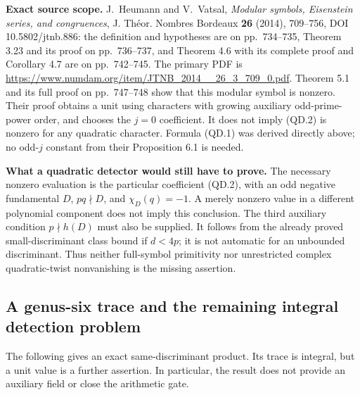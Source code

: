 \documentclass[11pt,a4paper]{article}
\theoremstyle{definition}
\renewcommand{\paragraph}[1]{\par\smallskip\noindent\textbf{#1}\quad\ignorespaces}
\begin{document}
\paragraph{Exact source scope.}
J.~Heumann and V.~Vatsal, \emph{Modular symbols, Eisenstein series,
and congruences}, J. Th\'eor. Nombres Bordeaux \textbf{26} (2014),
709--756, DOI 10.5802/jtnb.886: the definition and hypotheses are on
pp.~734--735, Theorem 3.23 and its proof on pp.~736--737, and
Theorem 4.6 with its complete proof and Corollary 4.7 are on
pp.~742--745.  The primary PDF is
\url{https://www.numdam.org/item/JTNB_2014__26_3_709_0.pdf}.
Theorem 5.1 and its full proof on pp.~747--748 show that this modular
symbol is nonzero.  Their proof obtains a unit using characters with
growing auxiliary odd-prime-power order, and chooses the $j=0$
coefficient.  It does not imply (QD.2) is nonzero for any quadratic
character.  Formula (QD.1) was derived directly above; no odd-$j$
constant from their Proposition 6.1 is needed.

\paragraph{What a quadratic detector would still have to prove.}
The necessary nonzero evaluation is the particular coefficient (QD.2),
with an odd negative fundamental $D$, $p q\nmid D$, and
$\chi_D(q)=-1$.  A merely nonzero value in a different polynomial
component does not imply this conclusion.  The third auxiliary
condition $p\nmid h(D)$ must also be supplied.  It follows from the
already proved small-discriminant class bound if $d<4p$; it is not
automatic for an unbounded discriminant.  Thus neither full-symbol
primitivity nor unrestricted complex quadratic-twist nonvanishing is
the missing assertion.



\subsection{A genus-six trace and the remaining integral detection problem}

The following gives an exact same-discriminant product.  Its trace is
integral, but a unit value is a further assertion.  In particular, the
result does not provide an auxiliary field or close the arithmetic gate.
\end{document}
